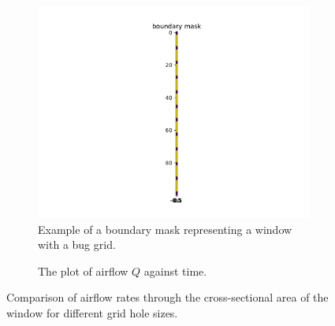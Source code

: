 \begin{figure}[H]
    \centering
    \begin{subfigure}[b]{0.47\textwidth}
        \centering
        \includegraphics[width=\textwidth]{figures/bound_ex2.pdf}
        \caption{Example of a boundary mask representing a window with a bug grid.}
        \label{fig: bound2}
    \end{subfigure}
    \hfill
    \begin{subfigure}[b]{0.47\textwidth}
        \centering
        \caption{The plot of airflow $Q$ against time.}
        \label{fig: flowrate2}
    \end{subfigure}
    \caption{Comparison of airflow rates through the cross-sectional area of the window for different grid hole sizes.}
    \label{fig: bound_plos_flowrate2}
\end{figure}

